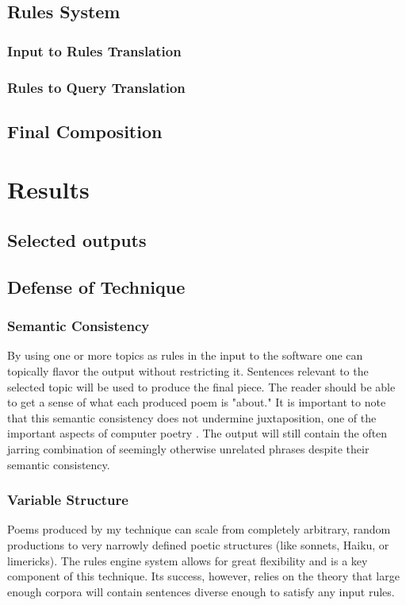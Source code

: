 \documentclass[10pt]{article}
\begin{document}
\subsection{Rules System}
\subsubsection{Input to Rules Translation}
\subsubsection{Rules to Query Translation}
\subsection{Final Composition}
\section{Results}
\subsection{Selected outputs}
\subsection{Defense of Technique}

\subsubsection{Semantic Consistency}
By using one or more topics as rules in the input to the software one can
topically flavor the output without restricting it. Sentences relevant to the
selected topic will be used to produce the final piece. The reader should be
able to get a sense of what each produced poem is "about." It is important to
note that this semantic consistency does not undermine juxtaposition, one of
the important aspects of computer poetry \cite{Hart96}. The output will still
contain the often jarring combination of seemingly otherwise unrelated phrases
despite their semantic consistency.

\subsubsection{Variable Structure}
Poems produced by my technique can scale from completely arbitrary, random
productions to very narrowly defined poetic structures (like sonnets, Haiku, or
limericks). The rules engine system allows for great flexibility and is a key
component of this technique. Its success, however, relies on the theory that
large enough corpora will contain sentences diverse enough to satisfy any input
rules.
\end{document}
